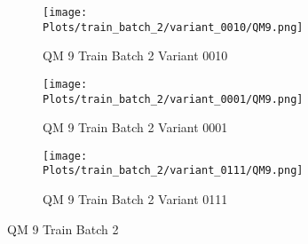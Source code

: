 \documentclass{DissertateFigs}
\begin{document}
\begin{figure}[t!]
\medskip

    \begin{subfigure}{0.47\textwidth}
    \texttt{[image: Plots/train\_batch\_2/variant\_0010/QM9.png]}
    \caption{QM 9 Train Batch 2 Variant 0010}
    \end{subfigure}
    \begin{subfigure}{0.47\textwidth}
    \texttt{[image: Plots/train\_batch\_2/variant\_0001/QM9.png]}
    \caption{QM 9 Train Batch 2 Variant 0001}
    \end{subfigure}

\medskip

    \begin{subfigure}{0.47\textwidth}
    \texttt{[image: Plots/train\_batch\_2/variant\_0111/QM9.png]}
    \caption{QM 9 Train Batch 2 Variant 0111}
    \end{subfigure}
\caption{QM 9 Train Batch 2}
    \end{figure}
\clearpage
\end{document}
